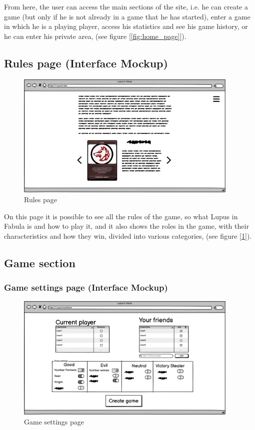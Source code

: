 From here, the user can access the main sections of the site, i.e. he can create a game (but only if he is not already in a game that he has started), enter a game in which he is a playing player, access his statistics and see his game history, or he can enter his private area, (see figure [\ref{fig:home_page}]).

\subsection{Rules page (Interface Mockup)}

\begin{figure}[htb] 
    \centering
    \includegraphics[height=6cm]{images/Page/Rules.png}
    \caption{Rules page}
    \label{fig:rules_page}
\end{figure}
On this page it is possible to see all the rules of the game,  so what Lupus in Fabula is and how to play it, and it also shows the roles in the game, with their characteristics and how they win, divided into various categories, (see figure [\ref{fig:rules_page}]).

\subsection{Game section}

\subsubsection{Game settings page (Interface Mockup)}
\begin{figure}[htb] 
    \centering
    \includegraphics[height=6cm]{images/Page/GameCration.png}
    \caption{Game settings page}
    \label{fig:GameCration_page}
\end{figure}

